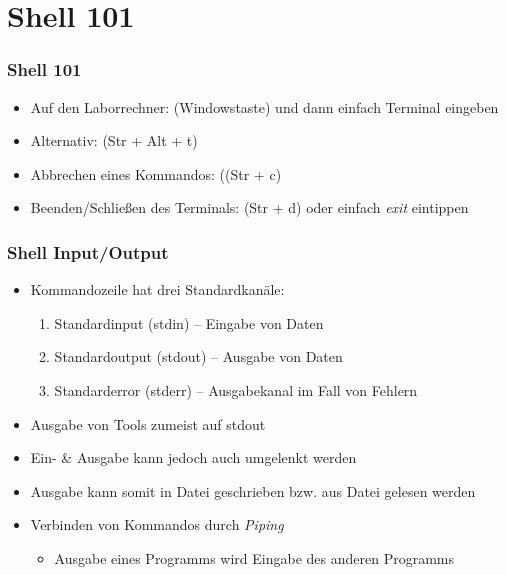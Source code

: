 \documentclass[xcolor=dvipsnames,aspectratio=169]{beamer}
\begin{document}
\section{Shell 101}
\begin{frame}
	\frametitle{Shell 101}
	\begin{itemize}
		\item Auf den Laborrechner: \keys{\winmenu} (Windowstaste) und dann einfach Terminal eingeben
		\item Alternativ:  (Str + Alt + t)
		\item Abbrechen eines Kommandos:  ((Str + c)
		\item Beenden/Schließen des Terminals:  (Str + d) oder einfach \emph{exit} eintippen
	\end{itemize}
\end{frame}

\begin{frame}
	\frametitle{Shell Input/Output}
	\begin{itemize}
		\item Kommandozeile hat drei Standardkanäle:
		\begin{enumerate}
			\item Standardinput (stdin) -- Eingabe von Daten
			\item Standardoutput (stdout) -- Ausgabe von Daten
			\item Standarderror (stderr) -- Ausgabekanal im Fall von Fehlern
		\end{enumerate}
		\item Ausgabe von Tools zumeist auf stdout
		\item Ein- \& Ausgabe kann jedoch auch umgelenkt werden
		\item Ausgabe kann somit in Datei geschrieben bzw. aus Datei gelesen werden
		\item Verbinden von Kommandos durch \emph{Piping}
		\begin{itemize}
			\item Ausgabe eines Programms wird Eingabe des anderen Programms
		\end{itemize}
	\end{itemize}
\end{frame}
\end{document}
